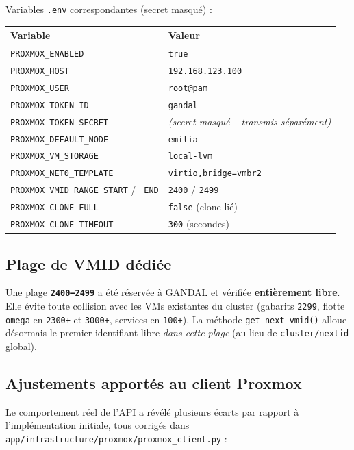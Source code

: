 \documentclass[11pt,a4paper]{article}
\newcommand{\code}[1]{\texttt{\small #1}}
\begin{document}
\noindent Variables \code{.env} correspondantes (secret masqué) :

\begin{tabularx}{\linewidth}{@{}l X@{}}
\toprule
\textbf{Variable} & \textbf{Valeur} \\
\midrule
\code{PROXMOX\_ENABLED} & \code{true} \\
\code{PROXMOX\_HOST} & \code{192.168.123.100} \\
\code{PROXMOX\_USER} & \code{root@pam} \\
\code{PROXMOX\_TOKEN\_ID} & \code{gandal} \\
\code{PROXMOX\_TOKEN\_SECRET} & \textit{(secret masqué -- transmis séparément)} \\
\code{PROXMOX\_DEFAULT\_NODE} & \code{emilia} \\
\code{PROXMOX\_VM\_STORAGE} & \code{local-lvm} \\
\code{PROXMOX\_NET0\_TEMPLATE} & \code{virtio,bridge=vmbr2} \\
\code{PROXMOX\_VMID\_RANGE\_START} / \code{\_END} & \code{2400} / \code{2499} \\
\code{PROXMOX\_CLONE\_FULL} & \code{false} (clone lié) \\
\code{PROXMOX\_CLONE\_TIMEOUT} & \code{300} (secondes) \\
\bottomrule
\end{tabularx}

\subsection{Plage de VMID dédiée}

Une plage \textbf{\code{2400--2499}} a été réservée à GANDAL et vérifiée \textbf{entièrement
libre}. Elle évite toute collision avec les VMs existantes du cluster (gabarits
\code{2299}, flotte \code{omega} en \code{2300+} et \code{3000+}, services en \code{100+}).
La méthode \code{get\_next\_vmid()} alloue désormais le premier identifiant libre
\emph{dans cette plage} (au lieu de \code{cluster/nextid} global).

\subsection{Ajustements apportés au client Proxmox}

Le comportement réel de l'API a révélé plusieurs écarts par rapport à l'implémentation
initiale, tous corrigés dans \code{app/infrastructure/proxmox/proxmox\_client.py} :
\end{document}
